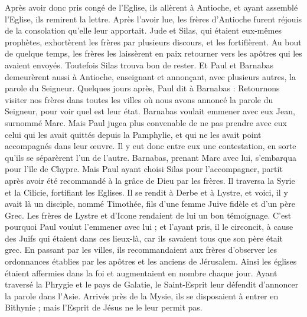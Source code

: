 \begin{multicols}{2}
{{Après avoir donc pris congé de l'Eglise, ils allèrent à Antioche, et ayant assemblé l'Eglise, ils remirent la lettre.
Après l'avoir lue, les frères d'Antioche furent réjouis de la consolation qu'elle leur apportait.
Jude et Silas, qui étaient eux-mêmes prophètes, exhortèrent les frères par plusieurs discours, et les fortifièrent.
Au bout de quelque temps, les frères les laissèrent en paix retourner vers les apôtres qui les avaient envoyés.
Toutefois Silas trouva bon de rester.
Et Paul et Barnabas demeurèrent aussi à Antioche, enseignant et annonçant, avec plusieurs autres, la parole du Seigneur.
Quelques jours après, Paul dit à Barnabas : Retournons visiter nos frères dans toutes les villes où nous avons annoncé la parole du Seigneur, pour voir quel est leur état.
Barnabas voulait emmener avec eux Jean, surnommé Marc.
Mais Paul jugea plus convenable de ne pas prendre avec eux celui qui les avait quittés depuis la Pamphylie, et qui ne les avait point accompagnés dans leur œuvre.
Il y eut donc entre eux une contestation, en sorte qu'ils se séparèrent l'un de l'autre. Barnabas, prenant Marc avec lui, s'embarqua pour l'île de Chypre.
Mais Paul ayant choisi Silas pour l'accompagner, partit après avoir été recommandé à la grâce de Dieu par les frères.
Il traversa la Syrie et la Cilicie, fortifiant les Eglises.
\VerseOne{}Il se rendit à Derbe et à Lystre, et voici, il y avait là un disciple, nommé Timothée, fils d'une femme Juive fidèle et d'un père Grec.
Les frères de Lystre et d'Icone rendaient de lui un bon témoignage.
C'est pourquoi Paul voulut l'emmener avec lui ; et l'ayant pris, il le circoncit, à cause des Juifs qui étaient dans ces lieux-là, car ils savaient tous que son père était grec.
En passant par les villes, ils recommandaient aux frères d'observer les ordonnances établies par les apôtres et les anciens de Jérusalem.
Ainsi les églises étaient affermies dans la foi et augmentaient en nombre chaque jour.
Ayant traversé la Phrygie et le pays de Galatie, le Saint-Esprit leur défendit d'annoncer la parole dans l'Asie.
Arrivés près de la Mysie, ils se disposaient à entrer en Bithynie ; mais l'Esprit de Jésus ne le leur permit pas.
}}
\end{multicols}

